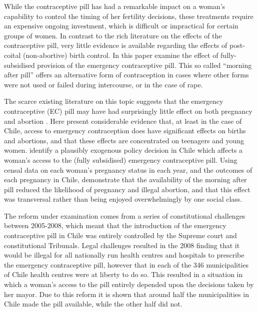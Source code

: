 While the contraceptive pill has had a remarkable impact on a woman's capability
to control the timing of her fertility decisions, these treatments require an
expensive ongoing investment, which is difficult or impractical for certain groups
of women.  In contrast to the rich literature on the effects of the contraceptive 
pill, very little evidence is available regarding the effects of post-coital 
(non-abortive) birth control.  In this paper \person examine the effect of
fully-subsidised provision of the emergency contraceptive pill.  This so called 
``morning after pill'' offers an alternative form of contraception in cases where 
other forms were not used or failed during intercourse, or in the case of rape.

The scarce existing literature on this topic suggests that the emergency 
contraceptive (EC) pill may have had surprisingly little effect on both pregnancy
and abortion \citep{Grossetal2012,Durrance2013}.  Here \person present
considerable evidence that, at least in the case of Chile, access to emergency 
contraception does have significant effects on births and abortions, and that
these effects are concentrated on teenagers and young women.  \Person identify 
a plausibly exogenous policy decision in Chile which affects a woman's access to 
the (fully subsidised) emergency contraceptive pill.  Using censal data on each 
woman's pregnancy status in each year, and the outcomes of each pregnancy in Chile, 
\person demonstrate that the availability of the morning after pill reduced the 
likelihood of pregnancy and illegal abortion, and that this effect was transversal 
rather than being enjoyed overwhelmingly by one social class. 

The reform under examination comes from a series of constitutional challenges 
between 2005-2008, which meant that the introduction of the emergency contraceptive 
pill in Chile was entirely controlled by the Supreme court and constitutional 
Tribunals.  Legal challenges resulted in the 2008 finding that it would be illegal 
for all nationally run health centres and hospitals to prescribe the emergency 
contraceptive pill, however that in each of the 346 municipalities of Chile health 
centres were at liberty to do so.  This resulted  in a situation in which a woman's 
access to the pill entirely depended upon the decisions taken by her mayor.  Due 
to this reform it is shown that around half the municipalities in Chile made the 
pill available, while the other half did not.

